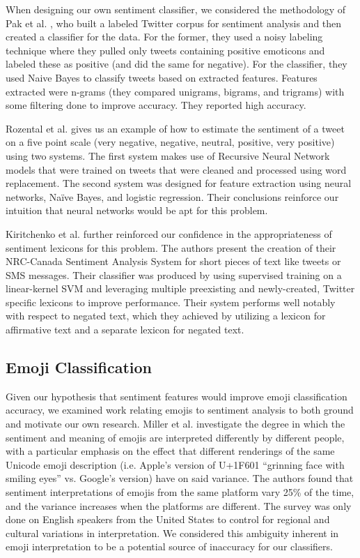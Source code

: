 \documentclass[11pt]{article}
\begin{document}
When designing our own sentiment classifier, we considered the methodology of Pak et al. \cite{pak2010twitter}, who built a labeled Twitter corpus for sentiment analysis and then created a classifier for the data. For the former, they used a noisy labeling technique where they pulled only tweets containing positive emoticons and labeled these as positive (and did the same for negative). For the classifier, they used Naive Bayes to classify tweets based on extracted features. Features extracted were n-grams (they compared unigrams, bigrams, and trigrams) with some filtering done to improve accuracy. They reported high accuracy.

Rozental et al. \cite{rozental2017amobee} gives us an example of how to estimate the sentiment of a tweet on a five point scale (very negative, negative, neutral, positive, very positive) using two systems.  The first system makes use of Recursive Neural Network models that were trained on tweets that were cleaned and processed using word replacement.  The second system was designed for feature extraction using neural networks, Naïve Bayes, and logistic regression. Their conclusions reinforce our intuition that neural networks would be apt for this problem.

Kiritchenko et al. \cite{kiritchenko2014sentiment} further reinforced our confidence in the appropriateness of sentiment lexicons for this problem. The authors present the creation of their NRC-Canada Sentiment Analysis System for short pieces of text like tweets or SMS messages. Their classifier was produced by using supervised training on a linear-kernel SVM and leveraging multiple preexisting and newly-created, Twitter specific lexicons to improve performance. Their system performs well notably with respect to negated text, which they achieved by utilizing a lexicon for affirmative text and a separate lexicon for negated text.

\subsection{Emoji Classification}

Given our hypothesis that sentiment features would improve emoji classification accuracy, we examined work relating emojis to sentiment analysis to both ground and motivate our own research. Miller et al. \cite{miller2016blissfully} investigate the degree in which the sentiment and meaning of emojis are interpreted differently by different people, with a particular emphasis on the effect that different renderings of the same Unicode emoji description (i.e. Apple’s version of U+1F601 “grinning face with smiling eyes” vs. Google’s version) have on said variance. The authors found that sentiment interpretations of emojis from the same platform vary 25\% of the time, and the variance increases when the platforms are different. The survey was only done on English speakers from the United States to control for regional and cultural variations in interpretation. We considered this ambiguity inherent in emoji interpretation to be a potential source of inaccuracy for our classifiers.
\end{document}
